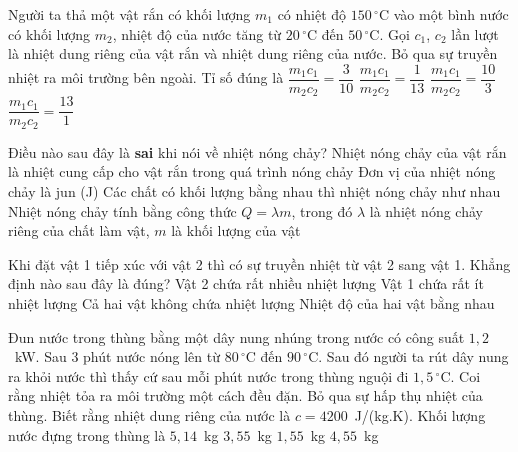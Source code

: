 	\begin{ex}%
		Người ta thả một vật rắn có khối lượng $m_1$ có nhiệt độ $150\,^\circ\text{C}$ vào một bình nước có khối lượng $m_2$, nhiệt độ của nước tăng từ $20\,^\circ\text{C}$ đến $50\,^\circ\text{C}$. Gọi $c_1$, $c_2$ lần lượt là nhiệt dung riêng của vật rắn và nhiệt dung riêng của nước. Bỏ qua sự truyền nhiệt ra môi trường bên ngoài. Tỉ số đúng là
		\choice
		{\True $\dfrac{m_1c_1}{m_2c_2}=\dfrac{3}{10}$}
		{$\dfrac{m_1c_1}{m_2c_2}=\dfrac{1}{13}$}
		{$\dfrac{m_1c_1}{m_2c_2}=\dfrac{10}{3}$}
		{$\dfrac{m_1c_1}{m_2c_2}=\dfrac{13}{1}$}
	\end{ex}

	\begin{ex}%
		Điều nào sau đây là \textbf{sai} khi nói về nhiệt nóng chảy?
		\choice
		{Nhiệt nóng chảy của vật rắn là nhiệt cung cấp cho vật rắn trong quá trình nóng chảy}
		{Đơn vị của nhiệt nóng chảy là jun (J)}
		{\True Các chất có khối lượng bằng nhau thì nhiệt nóng chảy như nhau}
		{Nhiệt nóng chảy tính bằng công thức $Q=\lambda m$, trong đó $\lambda$ là nhiệt nóng chảy riêng của chất làm vật, $m$ là khối lượng của vật}
	\end{ex}

	\begin{ex}%
		Khi đặt vật 1 tiếp xúc với vật 2 thì có sự truyền nhiệt từ vật 2 sang vật 1. Khẳng định nào sau đây là đúng?
		\choice
		{Vật 2 chứa rất nhiều nhiệt lượng}
		{Vật 1 chứa rất ít nhiệt lượng}
		{\True Cả hai vật không chứa nhiệt lượng}
		{Nhiệt độ của hai vật bằng nhau}
	\end{ex}

	\begin{ex}%
		Đun nước trong thùng bằng một dây nung nhúng trong nước có công suất $1{,}2$~kW. Sau $3$ phút nước nóng lên từ $80\,^\circ\text{C}$ đến $90\,^\circ\text{C}$. Sau đó người ta rút dây nung ra khỏi nước thì thấy cứ sau mỗi phút nước trong thùng nguội đi $1{,}5\,^\circ\text{C}$. Coi rằng nhiệt tỏa ra môi trường một cách đều đặn. Bỏ qua sự hấp thụ nhiệt của thùng. Biết rằng nhiệt dung riêng của nước là $c=4200$~J/(kg.K). Khối lượng nước đựng trong thùng là
		\choice
		{$5{,}14$~kg}
		{\True $3{,}55$~kg}
		{$1{,}55$~kg}
		{$4{,}55$~kg}
	\end{ex}

